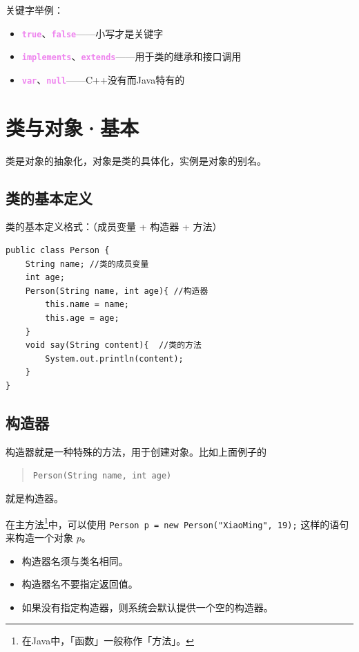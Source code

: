 \documentclass[UTF8]{ctexart}
\newcommand\Emph[1]{\colorbox{green!10}{\textcolor{green!30!black}{#1}}}
\newcommand\keyword[1]{\textcolor{violet}{\textbf{\texttt{#1}}}}
\begin{document}
关键字举例：
\begin{itemize}[itemsep=0pt,parsep=0pt]
  \item \keyword{true}、\keyword{false}——小写才是关键字
  \item \keyword{implements}、\keyword{extends}——用于类的继承和接口调用
  \item \keyword{var}、\keyword{null}——C++没有而Java特有的
\end{itemize}

\section{类与对象·基本}
\begin{center}
  \Emph{类}是对象的抽象化，\Emph{对象}是类的具体化，\Emph{实例}是对象的别名。
\end{center}

\subsection{类的基本定义}
类的基本定义格式：（成员变量 + 构造器 + 方法）
\begin{lstlisting}
public class Person {
    String name; //类的成员变量
    int age;
    Person(String name, int age){ //构造器
        this.name = name;
        this.age = age;
    }
    void say(String content){  //类的方法
        System.out.println(content);
    }
}
\end{lstlisting}

\subsection{构造器}
构造器就是一种特殊的方法，用于创建对象。比如上面例子的
\begin{quote}
  \verb!Person(String name, int age)!
\end{quote}
就是构造器。

在主方法\footnote{在Java中，「函数」一般称作「方法」。}中，可以使用 \verb!Person p = new Person("XiaoMing", 19);! 这样的语句来构造一个对象 $p$。

\begin{mybox}
\begin{itemize}[itemsep=0pt,parsep=0pt]
  \item 构造器名须与类名相同。
  \item 构造器名不要指定返回值。
  \item 如果没有指定构造器，则系统会默认提供一个空的构造器。
\end{itemize}
\end{mybox}
\end{document}
